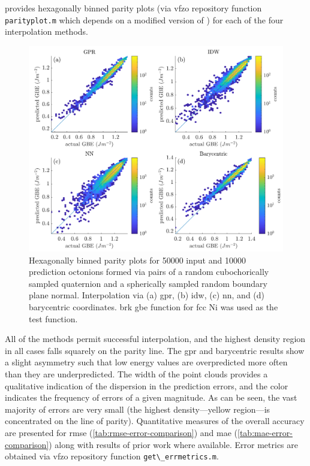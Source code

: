 \documentclass[final,twocolumn,12pt]{elsarticle}
\newcommand{\matlab}[1]{\mbox{\lstinline[style=Matlab-editor]{#1}}}
\newcommand{\inpt}{input}
\newcommand{\outpt}{prediction}
\newcommand{\vfzorepo}{\gls{vfzo} repository}
\begin{document}
 provides hexagonally binned parity plots (via \vfzorepo{} function \matlab{parityplot.m} which depends on a modified version of \cite{beanHexscatter2020}) for each of the four interpolation methods.
\begin{figure}
    \centering
    \includegraphics[scale=1]{brkparity50000.png}
    \caption{Hexagonally binned parity plots for \num{50000} \inpt{} and \num{10000} \outpt{} octonions formed via pairs of a random cubochorically sampled quaternion and a spherically sampled random boundary plane normal. Interpolation via (a) \gls{gpr}, (b) \gls{idw}, (c) \gls{nn}, and (d) barycentric coordinates.  \gls{brk} \gls{gbe} function for \gls{fcc} Ni \cite{bulatovGrainBoundaryEnergy2014} was used as the test function.}
    \label{fig:brkparity50000}
\end{figure}

All of the methods permit successful interpolation, and the highest density region in all cases falls squarely on the parity line. The \gls{gpr} and barycentric results show a slight asymmetry such that low energy values are overpredicted more often than they are underpredicted. The width of the point clouds provides a qualitative indication of the dispersion in the prediction errors, and the color indicates the frequency of errors of a given magnitude. As can be seen, the vast majority of errors are very small (the highest density---yellow region---is concentrated on the line of parity). Quantitative measures of the overall accuracy are presented for \gls{rmse} (\cref{tab:rmse-error-comparison}) and \gls{mae} (\cref{tab:mae-error-comparison}) along with results of prior work where available. Error metrics are obtained via \vfzorepo{} function \matlab{get\_errmetrics.m}.
\end{document}
